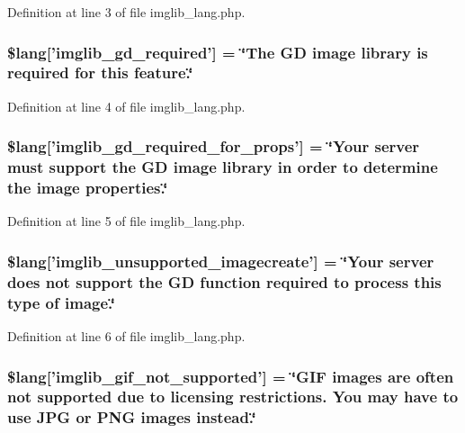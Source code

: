 Definition at line 3 of file imglib\-\_\-lang.\-php.

\hypertarget{imglib__lang_8php_aa8d7f8276e62fbe759daef2021c16552}{
\subsubsection[{\$lang}]{\setlength{\rightskip}{0pt plus 5cm}\$lang\mbox{[}'imglib\-\_\-gd\-\_\-required'\mbox{]} = \char`\"{}The G\-D image library is required {\bf for} this feature.\char`\"{}}}\label{imglib__lang_8php_aa8d7f8276e62fbe759daef2021c16552}


Definition at line 4 of file imglib\-\_\-lang.\-php.

\hypertarget{imglib__lang_8php_a0da9c99f9e2b5f38ccbefb9d9f702c5e}{
\subsubsection[{\$lang}]{\setlength{\rightskip}{0pt plus 5cm}\$lang\mbox{[}'imglib\-\_\-gd\-\_\-required\-\_\-for\-\_\-props'\mbox{]} = \char`\"{}Your server must support the G\-D image library in order {\bf to} determine the image properties.\char`\"{}}}\label{imglib__lang_8php_a0da9c99f9e2b5f38ccbefb9d9f702c5e}


Definition at line 5 of file imglib\-\_\-lang.\-php.

\hypertarget{imglib__lang_8php_ace032cbe8dafb1f3417a758d0914ecdb}{
\subsubsection[{\$lang}]{\setlength{\rightskip}{0pt plus 5cm}\$lang\mbox{[}'imglib\-\_\-unsupported\-\_\-imagecreate'\mbox{]} = \char`\"{}Your server does {\bf not} support the G\-D function required {\bf to} process this type of image.\char`\"{}}}\label{imglib__lang_8php_ace032cbe8dafb1f3417a758d0914ecdb}


Definition at line 6 of file imglib\-\_\-lang.\-php.

\hypertarget{imglib__lang_8php_a235a59a6660145fc136b3933b5b10675}{
\subsubsection[{\$lang}]{\setlength{\rightskip}{0pt plus 5cm}\$lang\mbox{[}'imglib\-\_\-gif\-\_\-not\-\_\-supported'\mbox{]} = \char`\"{}G\-I\-F images are often {\bf not} supported due {\bf to} licensing restrictions. You may have {\bf to} use J\-P\-G {\bf or} P\-N\-G images instead.\char`\"{}}}\label{imglib__lang_8php_a235a59a6660145fc136b3933b5b10675}


